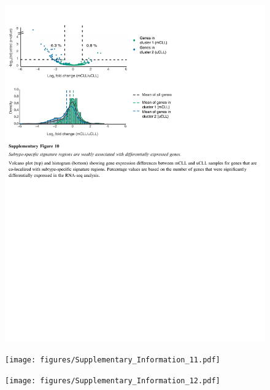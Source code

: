 \documentclass[10pt,]{article}
\begin{document}
\begin{figure}
\centering
\includegraphics[width=1.000\hsize]{figures/Supplementary_Information_10.pdf}
\end{figure}
\clearpage

\begin{figure}
\centering
\texttt{[image: figures/Supplementary\_Information\_11.pdf]}
\end{figure}
\clearpage

\begin{figure}
\centering
\texttt{[image: figures/Supplementary\_Information\_12.pdf]}
\end{figure}
\clearpage
\end{document}
